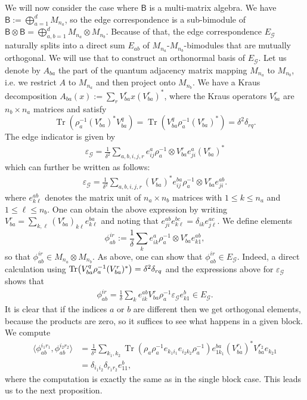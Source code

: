 \documentclass[a4paper,reqno]{amsart}
\numberwithin{equation}{section}
\numberwithin{theorem}{section}
\theoremstyle{definition}\newtheorem{definition}[theorem]{Definition}
\theoremstyle{definition}\newtheorem{remark}[theorem]{Remark}
\theoremstyle{definition}\newtheorem{example}[theorem]{Example}
\theoremstyle{definition}\newtheorem*{notation*}{Notation}
\theoremstyle{definition}\newtheorem*{convention*}{Convention}
\theoremstyle{definition}\newtheorem{observation}{Observation}
\theoremstyle{definition}\newtheorem*{acknowledgment*}{Acknowledgments}
\newcommand{\B}{\mathsf{B}}
\newcommand{\G}{\mathcal{G}}
\renewcommand{\op}[1]{\operatorname{#1}}
\begin{document}
We will now consider the case where $\B$ is a multi-matrix algebra. We have $\B:= \bigoplus_{a=1}^{d} M_{n_{a}}$, so the edge correspondence is a sub-bimodule of $\B\otimes \B = \bigoplus_{a,b=1}^{d} M_{n_{a}} \otimes M_{n_{b}}$. Because of that, the edge correspondence $E_\G$ naturally splits into a direct sum $E_{ab}$ of $M_{n_{a}}$-$M_{n_b}$-bimodules that are mutually orthogonal. We will use that to construct an orthonormal basis of $E_\G$. Let us denote by $A_{ba}$ the part of the quantum adjacency matrix mapping $M_{n_{a}}$ to $M_{n_b}$, i.e. we restrict $A$ to $M_{n_a}$ and then project onto $M_{n_b}$. We have a Kraus decomposition $A_{ba}(x) := \sum_{r} V_{ba}^{r} x (V_{ba}^{r})^{\ast}$, where the Kraus operators $V_{ba}^r$ are $n_b\times n_a$ matrices and satisfy 
\[\op{Tr}(\rho_{a}^{-1} (V_{ba}^{r})^{\ast} V_{ba}^{q}) = \op{Tr}(V_{ba}^{q} \rho_{a}^{-1}(V_{ba}^{r})^{\ast} )=\delta^2 \delta_{rq}.\]  The edge indicator is given by
\begin{align*}
    \varepsilon_\G = \frac{1}{\delta^2} \sum_{a,b,i,j,r} e_{ij}^a\rho_a^{-1} \otimes V_{ba}^r e_{ji}^a (V_{ba}^r)^{\ast}
\end{align*}
which can further be written as follows:
\begin{align*}
     \varepsilon_\G = \frac{1}{\delta^2} \sum_{a,b,i,j,r} (V_{ba}^r)^*e_{ij}^{ba}\rho_a^{-1} \otimes V_{ba}^r e_{ji}^{ab}.
\end{align*}
where $e_{k\ell}^{ab}$ denotes the matrix unit of $n_a\times n_b$ matrices with $1\leq k\leq n_{a}$ and $1\leq \ell \leq n_{b}$.
One can obtain the above expression by writing $V_{ba}^r=\sum_{k,\ell} (V_{ba}^r)_{k\ell}e_{k\ell}^{ba}$ and noting that $e_{ji}^{ab}e_{k\ell}^{bc}=\delta_{ik}e^{ac}_{j\ell}$.
We define elements
\[
\phi_{ab}^{ir}:= \frac{1}{\delta} \sum_{k} e_{ik}^{a} \rho_{a}^{-1} \otimes V_{ba}^{r} e_{k1}^{ab},
\]
 so that $\phi_{ab}^{ir} \in M_{n_a} \otimes M_{n_b}$. As above, one can show that $\phi_{ab}^{ir}\in E_\G$. Indeed, a direct calculation using $\Tr(V_{ba}^q\rho_a^{-1}(V_{ba}^r)^*)=\delta^2\delta_{rq}$ and the  expressions above for $\varepsilon_\G$ shows that
\begin{align*}
   \phi_{ab}^{ir}=  \frac{1}{\delta}\sum_{k} e_{
   ik}^{ab} V_{ba}^r\rho_a^{-1}\varepsilon_\G e_{k1}^b\in E_\G.
\end{align*}
It is clear that if the indices $a$ or $b$ are different then we get orthogonal elements, because the products are zero, so it suffices to see what happens in a given block. We compute
\begin{align*}
\langle \phi_{ab}^{i_1 r_1}, \phi_{ab}^{i_2 r_2}\rangle &= \frac{1}{\delta^2} \sum_{k_1, k_2} \op{Tr}(\rho_{a} \rho_{a}^{-1} e_{k_1 i_1} e_{i_2 k_2} \rho_{a}^{-1}) e_{1k_{1}}^{ba} (V_{ba}^{r_1})^{\ast} V_{ba}^{r_2} e_{k_{2}1} \\
&= \delta_{i_1 i_2} \delta_{r_1 r_2} e_{11}^{b}, 
\end{align*}
where the computation is exactly the same as in the single block case. This leads us to the next proposition.
\end{document}
